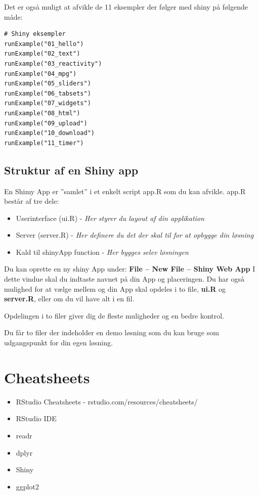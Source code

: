 \documentclass[
]{book}
\providecommand{\tightlist}{%
  \setlength{\itemsep}{0pt}\setlength{\parskip}{0pt}}
\begin{document}
Det er også muligt at afvikle de 11 eksempler der følger med shiny på følgende måde:

\begin{verbatim}
# Shiny eksempler
runExample("01_hello")
runExample("02_text")
runExample("03_reactivity")
runExample("04_mpg")
runExample("05_sliders")
runExample("06_tabsets")
runExample("07_widgets")
runExample("08_html")
runExample("09_upload")
runExample("10_download")
runExample("11_timer")
\end{verbatim}

\hypertarget{struktur-af-en-shiny-app}{%
\section{Struktur af en Shiny app}\label{struktur-af-en-shiny-app}}

En Shimy App er ''samlet'' i et enkelt script app.R som du kan afvikle.
app.R består af tre dele:

\begin{itemize}
\tightlist
\item
  Userinterface (ui.R) - \emph{Her styrer du layout af din applikation}
\item
  Server (server.R) - \emph{Her definere du det der skal til for at opbygge din løsning}
\item
  Kald til shinyApp function - \emph{Her bygges selev løsningen}
\end{itemize}

Du kan oprette en ny shiny App under:
\textbf{File -- New File -- Shiny Web App}
I dette vindue skal du indtaste navnet på din App og placeringen. Du har også mulighed for at vælge mellem og din App skal opdeles i to file, \textbf{ui.R} og \textbf{server.R}, eller om du vil have alt i en fil.

Opdelingen i to filer giver dig de fleste muligheder og en bedre kontrol.

Du får to filer der indeholder en demo løsning som du kan bruge som
udgangspunkt for din egen løsning.

\hypertarget{cheatsheets}{%
\chapter{Cheatsheets}\label{cheatsheets}}

\begin{itemize}
\tightlist
\item
  RStudio Cheatsheets - rstudio.com/resources/cheatsheets/
\item
  RStudio IDE
\item
  readr
\item
  dplyr
\item
  Shiny
\item
  ggplot2
\end{itemize}
\end{document}
